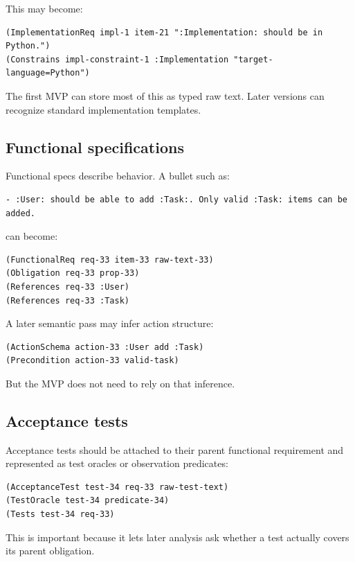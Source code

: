 \documentclass[11pt]{article}
\begin{document}
This may become:

\begin{verbatim}
(ImplementationReq impl-1 item-21 ":Implementation: should be in Python.")
(Constrains impl-constraint-1 :Implementation "target-language=Python")
\end{verbatim}

The first MVP can store most of this as typed raw text. Later versions can
recognize standard implementation templates.

\subsection{Functional specifications}

Functional specs describe behavior. A bullet such as:

\begin{verbatim}
- :User: should be able to add :Task:. Only valid :Task: items can be added.
\end{verbatim}

can become:

\begin{verbatim}
(FunctionalReq req-33 item-33 raw-text-33)
(Obligation req-33 prop-33)
(References req-33 :User)
(References req-33 :Task)
\end{verbatim}

A later semantic pass may infer action structure:

\begin{verbatim}
(ActionSchema action-33 :User add :Task)
(Precondition action-33 valid-task)
\end{verbatim}

But the MVP does not need to rely on that inference.

\subsection{Acceptance tests}

Acceptance tests should be attached to their parent functional requirement and
represented as test oracles or observation predicates:

\begin{verbatim}
(AcceptanceTest test-34 req-33 raw-test-text)
(TestOracle test-34 predicate-34)
(Tests test-34 req-33)
\end{verbatim}

This is important because it lets later analysis ask whether a test actually
covers its parent obligation.
\end{document}
